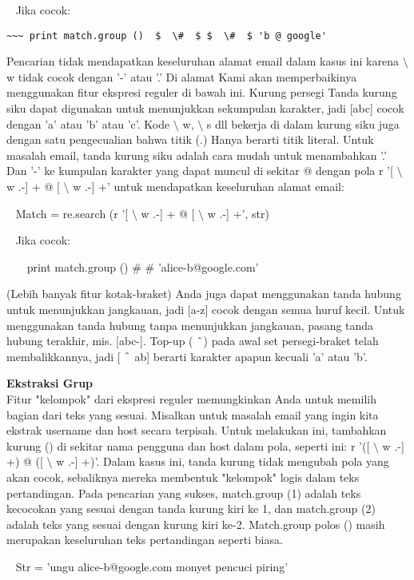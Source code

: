 \begin {enumerate}
\begin {enumerate}
~ Jika cocok:

\verb|~~~ print match.group ()  $  \#  $ $  \#  $ 'b @ google'|

Pencarian tidak mendapatkan keseluruhan alamat email dalam kasus ini karena  $  \setminus  $ w tidak cocok dengan '-' atau '.' Di alamat Kami akan memperbaikinya menggunakan fitur ekspresi reguler di bawah ini. Kurung persegi Tanda kurung siku dapat digunakan untuk menunjukkan sekumpulan karakter, jadi [abc] cocok dengan 'a' atau 'b' atau 'c'. Kode  $  \setminus  $ w,  $  \setminus  $ s dll bekerja di dalam kurung siku juga dengan satu pengecualian bahwa titik (.) Hanya berarti titik literal. Untuk masalah email, tanda kurung siku adalah cara mudah untuk menambahkan '.' Dan '-' ke kumpulan karakter yang dapat muncul di sekitar @ dengan pola r '[ $  \setminus  $ w .-] + @ [ $  \setminus  $ w .-] +' untuk mendapatkan keseluruhan alamat email:

~ Match = re.search (r '[ $  \setminus  $ w .-] + @ [ $  \setminus  $ w .-] +', str)

~ Jika cocok:

~~~ print match.group ()  $  \#  $ $  \#  $ 'alice-b@google.com'

(Lebih banyak fitur kotak-braket) Anda juga dapat menggunakan tanda hubung untuk menunjukkan jangkauan, jadi [a-z] cocok dengan semua huruf kecil. Untuk menggunakan tanda hubung tanpa menunjukkan jangkauan, pasang tanda hubung terakhir, mis. [abc-]. Top-up ( $  \string^  $) pada awal set persegi-braket telah membalikkannya, jadi [ $  \string^  $ ab] berarti karakter apapun kecuali 'a' atau 'b'.

{\fontsize{14pt}{14pt}\selectfont \textbf{Ekstraksi Grup} \\}
Fitur "kelompok" dari ekspresi reguler memungkinkan Anda untuk memilih bagian dari teks yang sesuai. Misalkan untuk masalah email yang ingin kita ekstrak username dan host secara terpisah. Untuk melakukan ini, tambahkan kurung () di sekitar nama pengguna dan host dalam pola, seperti ini: r '([ $  \setminus  $ w .-] +) @ ([ $  \setminus  $ w .-] +)'. Dalam kasus ini, tanda kurung tidak mengubah pola yang akan cocok, sebaliknya mereka membentuk "kelompok" logis dalam teks pertandingan. Pada pencarian yang sukses, match.group (1) adalah teks kecocokan yang sesuai dengan tanda kurung kiri ke 1, dan match.group (2) adalah teks yang sesuai dengan kurung kiri ke-2. Match.group polos () masih merupakan keseluruhan teks pertandingan seperti biasa.

~ Str = 'ungu alice-b@google.com monyet pencuci piring'


\end{enumerate}
\end{enumerate}
